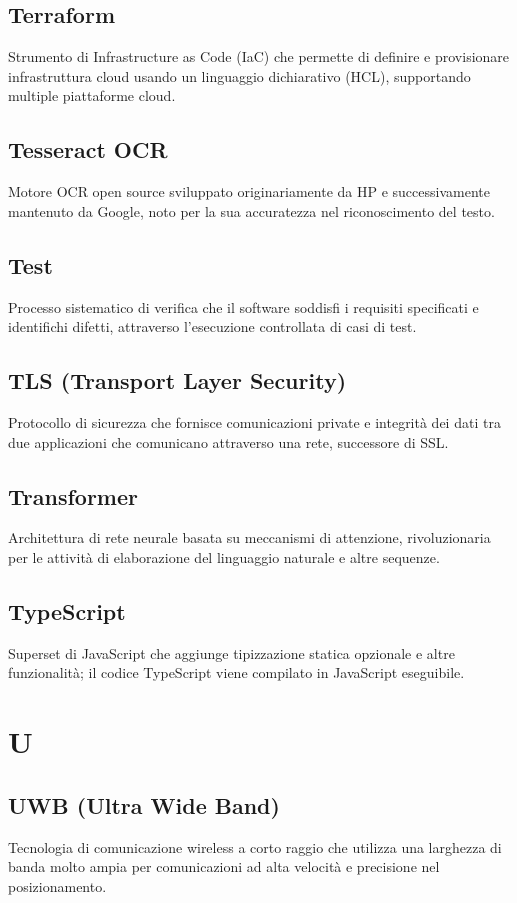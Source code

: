 \documentclass[a4paper,11pt]{article}
\begin{document}
\subsection{Terraform}
Strumento di Infrastructure as Code (IaC) che permette di definire e provisionare infrastruttura cloud usando un linguaggio dichiarativo (HCL), supportando multiple piattaforme cloud.

\subsection{Tesseract OCR}
Motore OCR open source sviluppato originariamente da HP e successivamente mantenuto da Google, noto per la sua accuratezza nel riconoscimento del testo.

\subsection{Test}
Processo sistematico di verifica che il software soddisfi i requisiti specificati e identifichi difetti, attraverso l'esecuzione controllata di casi di test.

\subsection{TLS (Transport Layer Security)}
Protocollo di sicurezza che fornisce comunicazioni private e integrità dei dati tra due applicazioni che comunicano attraverso una rete, successore di SSL.

\subsection{Transformer}
Architettura di rete neurale basata su meccanismi di attenzione, rivoluzionaria per le attività di elaborazione del linguaggio naturale e altre sequenze.

\subsection{TypeScript}
Superset di JavaScript che aggiunge tipizzazione statica opzionale e altre funzionalità; il codice TypeScript viene compilato in JavaScript eseguibile.

\newpage
\section{U}

\subsection{UWB (Ultra Wide Band)}
Tecnologia di comunicazione wireless a corto raggio che utilizza una larghezza di banda molto ampia per comunicazioni ad alta velocità e precisione nel posizionamento.
\end{document}

